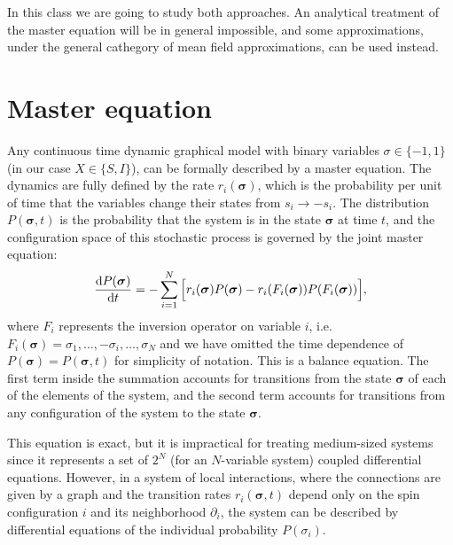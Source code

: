 In this class we are going to study both approaches. An analytical treatment of the master equation will be in general impossible, and some approximations, under the general cathegory of mean field approximations, can be used instead.

\section{Master equation}

Any continuous time dynamic graphical model with binary variables $\sigma \in \{-1,1\}$ (in our case $X \in \{S,I\}$), can be formally described by a master equation.  The dynamics are fully defined by the rate $r_i(\bm{\sigma})$, which is the probability per unit of time that the variables change their states from $s_i \rightarrow -s_i$. The distribution $P(\bm{\sigma},t)$ is the probability that the system is in the state $\bm{\sigma}$ at time $t$, and the configuration space of this stochastic process is governed by the joint master equation:
\begin{equation}
\frac{\mathrm{d} P ({\bm\sigma}) }{\mathrm{d} t} = - \sum_{i=1}^N \Big[
r_i({\bm\sigma}) P ({\bm\sigma}) - r_i(F_i({\bm\sigma})) P (F_i(\bm{\sigma}) ) \Big],
\label{eq:originalME}
\end{equation}
where $F_i$ represents the inversion operator on variable $i$, i.e. $F_i (\bm{\sigma}) = {\sigma_1, \dots, -\sigma_{i}, \dots, \sigma_N}$ and we have omitted the time dependence of $P(\bm{\sigma}) = P(\bm{\sigma},t)$ for simplicity of notation. This is a balance equation. The first term inside the summation accounts for transitions from the state $\bm{\sigma}$ of each of the elements of the system, and the second term accounts for transitions from any configuration of the system to the state $\bm{\sigma}$.

This equation is exact, but it is impractical for treating medium-sized systems since it represents a set of $2^N$ (for an $N$-variable system) coupled differential equations. However, in a system of local interactions, where the connections are given by a graph and the transition rates $r_i(\bm{\sigma}, t)$ depend only on the spin configuration $i$ and its neighborhood $\partial_i$, the system can be described by differential equations of the individual probability $P (\sigma_i)$.



